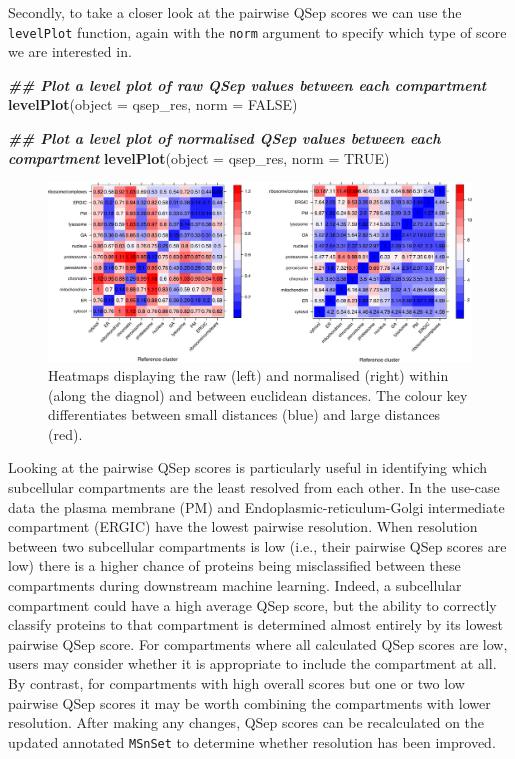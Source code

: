 \documentclass[9pt,a4paper,]{extarticle}
\newenvironment{Shaded}{\begin{snugshade}}{\end{snugshade}}
\newcommand{\AttributeTok}[1]{\textcolor[rgb]{0.13,0.29,0.53}{#1}}
\newcommand{\ConstantTok}[1]{\textcolor[rgb]{0.56,0.35,0.01}{#1}}
\newcommand{\DocumentationTok}[1]{\textcolor[rgb]{0.56,0.35,0.01}{\textbf{\textit{#1}}}}
\newcommand{\FunctionTok}[1]{\textcolor[rgb]{0.13,0.29,0.53}{\textbf{#1}}}
\newcommand{\NormalTok}[1]{#1}
\begin{document}
Secondly, to take a closer look at the pairwise QSep scores we can use the
\texttt{levelPlot} function, again with the \texttt{norm} argument to specify which type of
score we are interested in.

\begin{Shaded}
\begin{Highlighting}[]
\DocumentationTok{\#\# Plot a level plot of raw QSep values between each compartment}
\FunctionTok{levelPlot}\NormalTok{(}\AttributeTok{object =}\NormalTok{ qsep\_res, }\AttributeTok{norm =} \ConstantTok{FALSE}\NormalTok{)}

\DocumentationTok{\#\# Plot a level plot of normalised QSep values between each compartment}
\FunctionTok{levelPlot}\NormalTok{(}\AttributeTok{object =}\NormalTok{ qsep\_res, }\AttributeTok{norm =} \ConstantTok{TRUE}\NormalTok{)}
\end{Highlighting}
\end{Shaded}

\begin{figure}[H]

{\centering \includegraphics[width=0.9\linewidth,]{figs/qsep_levelplots_both} 

}

\caption{Heatmaps displaying the raw (left) and normalised (right) within (along the diagnol) and between euclidean distances. The colour key differentiates between small distances (blue) and large distances (red).}\label{fig:qsep-level-plots}
\end{figure}

Looking at the pairwise QSep scores is particularly useful in identifying which
subcellular compartments are the least resolved from each other. In the use-case
data the plasma membrane (PM) and Endoplasmic-reticulum-Golgi intermediate
compartment (ERGIC) have the lowest pairwise resolution. When resolution
between two subcellular compartments is low (i.e., their pairwise QSep scores
are low) there is a higher chance of proteins being misclassified between these
compartments during downstream machine learning. Indeed, a subcellular
compartment could have a high average QSep score, but the ability to correctly
classify proteins to that compartment is determined almost entirely by its
lowest pairwise QSep score. For compartments where all calculated QSep scores are
low, users may consider whether it is appropriate to include the compartment at
all. By contrast, for compartments with high overall scores but one or two low
pairwise QSep scores it may be worth combining the compartments with lower
resolution. After making any changes, QSep scores can be recalculated on the
updated annotated \texttt{MSnSet} to determine whether resolution has been improved.
\end{document}
